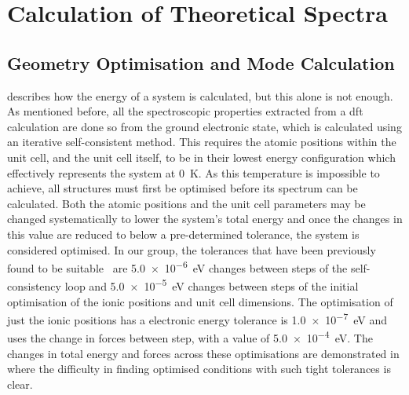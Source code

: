 \section{Calculation of Theoretical Spectra}
\subsection{Geometry Optimisation and Mode Calculation}
\label{subsec:GODMCalc}
 describes how the energy of a system is calculated, but this alone is not enough. As mentioned before, all the spectroscopic properties extracted from a \acrshort{dft} calculation are done so from the ground electronic state, which is calculated using an iterative self\nobreakdash-consistent method. This requires the atomic positions within the unit cell, and the unit cell itself, to be in their lowest energy configuration which effectively represents the system at \SI{0}{K}. As this temperature is impossible to achieve, all structures must first be optimised before its spectrum can be calculated. Both the atomic positions and the unit cell parameters may be changed systematically to lower the system's total energy and once the changes in this value are reduced to below a pre-determined tolerance, the system is considered optimised. In our group, the tolerances that have been previously found to be suitable~\cite{Kendrick2020} are \SI{5.0e-6}{eV} changes between steps of the self\nobreakdash-consistency loop and \SI{5.0e-5}{eV} changes between steps of the initial optimisation of the ionic positions and unit cell dimensions. The optimisation of just the ionic positions has a electronic energy tolerance is \SI{1.0e-7}{eV} and uses the change in forces between step, with a value of \SI{5.0e-4}{eV}. The changes in total energy and forces across these optimisations are demonstrated in  where the difficulty in finding optimised conditions with such tight tolerances is clear.

